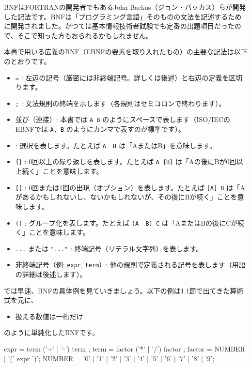 BNFはFORTRANの開発者でもあるJohn
Backus（ジョン・バッカス）らが開発した記法です。BNFは「プログラミング言語」そのものの文法を記述するために開発されました。かつては基本情報技術者試験でも定番の出題項目だったので、そこで知った方もおられるかもしれません。

本書で用いる広義のBNF（EBNFの要素を取り入れたもの）の主要な記法は以下のとおりです。

\begin{itemize}
\item
  \texttt{=} :
  左辺の記号（厳密には非終端記号。詳しくは後述）と右辺の定義を区切ります。
\item
  \texttt{;} :
  文法規則の終端を示します（各規則はセミコロンで終わります）。
\item
  並び（連接）: 本書では \texttt{A\ B}
  のようにスペースで表します（ISO/IECのEBNFでは \texttt{A,\ B}
  のようにカンマで表すのが標準です）。
\item
  \texttt{\textbar{}} : 選択を表します。たとえば \texttt{A\ \textbar{}\ B}
  は「AまたはB」を意味します。
\item
  \texttt{\{\}} : 0回以上の繰り返しを表します。たとえば \texttt{A\ \{B\}}
  は「Aの後にBが0回以上続く」ことを意味します。
\item
  \texttt{{[}{]}} : 0回または1回の出現（オプション）を表します。たとえば
  \texttt{{[}A{]}\ B}
  は「Aがあるかもしれないし、ないかもしれないが、その後にBが続く」ことを意味します。
\item
  \texttt{()} : グループ化を表します。たとえば
  \texttt{(A\ \textbar{}\ B)\ C}
  は「AまたはBの後にCが続く」ことを意味します。
\item
  \texttt{\textquotesingle{}...\textquotesingle{}} または
  \texttt{"..."} : 終端記号（リテラル文字列）を表します。
\item
  非終端記号（例: \texttt{expr}, \texttt{term}）:
  他の規則で定義される記号を表します（用語の詳細は後述します）。
\end{itemize}

では早速、BNFの具体例を見ていきましょう。以下の例は1.1節で出てきた算術式を元に、

\begin{itemize}
\item
  扱える数値は一桁だけ
\end{itemize}

\noindent のように単純化したBNFです。

\begin{codescreen}{}
expr = term { ('+' | '-') term };
term = factor { ('*' | '/') factor };
factor = NUMBER | '(' expr ')';
NUMBER = '0' | '1' | '2' | '3' | '4' | '5' | '6' | '7' | '8' | '9';
\end{codescreen}


